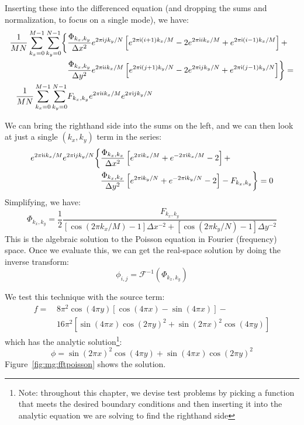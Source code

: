 Inserting these into the differenced equation (and dropping the sums
and normalization, to focus on a single mode), we have:
\begin{align}
\frac{1}{MN}\sum_{k_x=0}^{M-1}\sum_{k_y=0}^{N-1}
\biggl \{
&\frac{\Phi_{k_x,k_y}}{\Delta x^2} e^{2\pi\mathsf{i} j k_y/N}
  \left [ e^{2\pi\mathsf{i} (i+1) k_x/M} -2 e^{2\pi\mathsf{i} i k_x/M} +
         e^{2\pi\mathsf{i} (i-1) k_x/M} \right ] + \nonumber \\
&\frac{\Phi_{k_x,k_y}}{\Delta y^2} e^{2\pi\mathsf{i} i k_x/M}
  \left [ e^{2\pi\mathsf{i} (j+1) k_y/N} -2 e^{2\pi\mathsf{i} j k_y/N} +
         e^{2\pi\mathsf{i} (j-1) k_y/N} \right ] \biggr \} = \nonumber \\
\frac{1}{MN}\sum_{k_x=0}^{M-1}\sum_{k_y=0}^{N-1}
 & F_{k_x,k_y} e^{2\pi\mathsf{i} i k_x/M} e^{2\pi\mathsf{i} j k_y/N}
\end{align}

We can bring the righthand side into the sums on the left, and we can
then look at just a single $(k_x,k_y)$ term in the series:
\begin{align}
  e^{2\pi\mathsf{i} i k_x/M} e^{2\pi\mathsf{i} j k_y/N}
  \biggl \{
  &\frac{\Phi_{k_x,k_x}}{\Delta x^2}
  \left [e^{2\pi\mathsf{i} k_x/M} + e^{-2\pi\mathsf{i} k_x/M} - 2 \right ] + \nonumber \\
  &\frac{\Phi_{k_x,k_x}}{\Delta y^2}
  \left [e^{2\pi\mathsf{i} k_y/N} + e^{-2\pi\mathsf{i} k_y/N} - 2 \right ] 
  - F_{k_x,k_y}
  \biggr \} = 0
\end{align}
Simplifying, we have:
\begin{equation}
  \Phi_{k_x,k_y} = \frac{1}{2}\frac{F_{k_x,k_y}}
      {\left [\cos(2\pi k_x/M) - 1 \right ] \Delta x^{-2} +
        \left [\cos(2\pi k_y/N) - 1 \right ] \Delta y^{-2}}
      \label{eq:FFTsol}
\end{equation}
This is the algebraic solution to the Poisson equation in Fourier (frequency)
space.  Once we evaluate this, we can get the real-space solution
by doing the inverse transform:
\begin{equation}
\phi_{i,j} = \mathcal{F}^{-1}(\Phi_{k_x,k_y})
\end{equation}


We test this technique with the source term:
\begin{align}
f =\, & 8\pi^2\cos(4\pi y) \left [\cos(4\pi x) - \sin(4\pi x) \right ] - \nonumber \\
    & 16\pi^2 \left [ \sin(4\pi x)\cos(2\pi y)^2 + \sin(2\pi x)^2 \cos(4\pi y) \right ]
    \label{eq:mg:fftsource}
\end{align}
which has the analytic solution\footnote{Note: throughout this
chapter, we devise test problems by picking a function
that meets the desired boundary conditions and then inserting
it into the analytic equation we are solving to find the righthand
side}:
\begin{equation}
\phi = \sin(2\pi x)^2 \cos(4\pi y) + \sin(4\pi x)\cos(2\pi y)^2
\end{equation}
Figure~\ref{fig:mg:fftpoisson} shows the solution.

